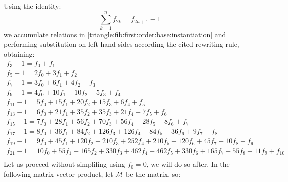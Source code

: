 \documentclass[a4paper,dottedtoc,headinclude,footinclude]{report} %
\theoremstyle{plain}
\begin{document}
    Using the identity:
    \begin{displaymath}
        \sum_{k=1}^{n} f_{2 k} = f_{2 n + 1} - 1
    \end{displaymath}
    we accumulate relations in \autoref{triangle:fib:first:order:base:instantiation} 
    and performing substitution on left hand sides according the cited 
    rewriting rule, obtaining:
    \begin{displaymath}
        \begin{array}{c}
            f_{3} - 1 = f_{0} + f_{1}\\
            f_{5} - 1 = 2 f_{0} + 3 f_{1} + f_{2}\\
            f_{7} - 1 = 3 f_{0} + 6 f_{1} + 4 f_{2} + f_{3}\\
            f_{9} - 1 = 4 f_{0} + 10 f_{1} + 10 f_{2} + 5 f_{3} + f_{4}\\
            f_{11} - 1 = 5 f_{0} + 15 f_{1} + 20 f_{2} + 15 f_{3} + 6 f_{4} + f_{5}\\
            f_{13} - 1 = 6 f_{0} + 21 f_{1} + 35 f_{2} + 35 f_{3} + 21 f_{4} + 7 f_{5} + f_{6}\\
            f_{15} - 1 = 7 f_{0} + 28 f_{1} + 56 f_{2} + 70 f_{3} + 56 f_{4} + 28 f_{5} + 8 f_{6} + f_{7}\\
            f_{17} - 1 = 8 f_{0} + 36 f_{1} + 84 f_{2} + 126 f_{3} + 126 f_{4} + 84 f_{5} + 36 f_{6} + 9 f_{7} + f_{8}\\
            f_{19} - 1 = 9 f_{0} + 45 f_{1} + 120 f_{2} + 210 f_{3} + 252 f_{4} + 210 f_{5} + 120 f_{6} + 45 f_{7} + 10 f_{8} + f_{9}\\
            f_{21} - 1 = 10 f_{0} + 55 f_{1} + 165 f_{2} + 330 f_{3} + 462 f_{4} + 462 f_{5} + 330 f_{6} + 165 f_{7} + 55 f_{8} + 11 f_{9} + f_{10}\\
        \end{array}
        \label{triangle:fib:first:order:odds}
    \end{displaymath}
    Let us proceed without simplifing using $f_{0}=0$, we will 
    do so after. In the following matrix-vector product, let $\mathcal{M}$
    be the matrix, so:
\end{document}
